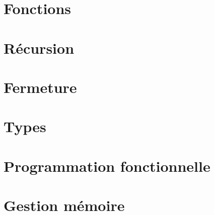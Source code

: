 \documentclass{scrreprt}
\begin{document}


\chapter{Fonctions}





\chapter{Récursion}


\chapter{Fermeture}




\chapter{Types}



\chapter{Programmation fonctionnelle}















\chapter{Gestion mémoire}






\end{document}
